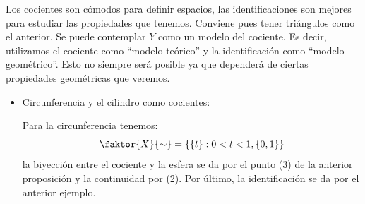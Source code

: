 \begin{pg}
    Los cocientes son cómodos para definir espacios, las identificaciones son mejores para estudiar las propiedades que tenemos. Conviene pues tener triángulos como el anterior. Se puede contemplar $Y$ como un modelo del cociente. Es decir, utilizamos el cociente como ``modelo teórico'' y la identificación como ``modelo geométrico''. Esto no siempre será posible ya que dependerá de ciertas propiedades geométricas que veremos.
\end{pg}

\begin{ej}[Anteriores]
\begin{itemize}
    \item Circunferencia y el cilindro como cocientes:
    \begin{figure}[H]
        \centering
    \end{figure}

    Para la circunferencia tenemos:
    \[
        \faktor{X}{\sim} = \left\{ \left\{ t \right\} : 0 < t < 1, \left\{ 0, 1 \right\} \right\}
    \]
    la biyección entre el cociente y la esfera se da por el punto (3) de la anterior proposición y la continuidad por (2). Por último, la identificación se da por el anterior ejemplo.


\end{itemize}
\end{ej}
